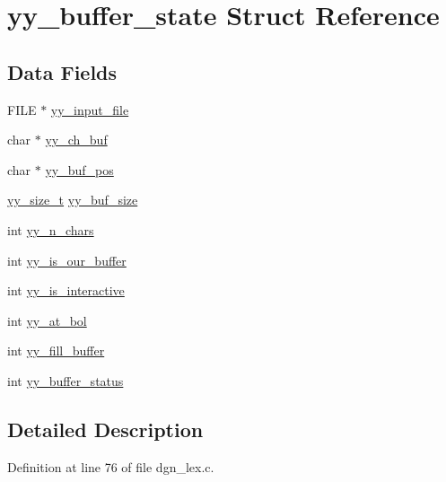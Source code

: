 \hypertarget{structyy__buffer__state}{\section{yy\+\_\+buffer\+\_\+state Struct Reference}
\label{structyy__buffer__state}
}
\subsection*{Data Fields}
\begin{DoxyCompactItemize}
\item 
F\+I\+L\+E $\ast$ \hyperlink{structyy__buffer__state_a4360acfb226a1fc240ab2be17dd6beda}{yy\+\_\+input\+\_\+file}
\item 
char $\ast$ \hyperlink{structyy__buffer__state_a0d25458e69eb22207fc633a1255d099d}{yy\+\_\+ch\+\_\+buf}
\item 
char $\ast$ \hyperlink{structyy__buffer__state_a8435c3f786bbb55d21d0174e4cfc22a0}{yy\+\_\+buf\+\_\+pos}
\item 
\hyperlink{dgn__lex_8c_aa14cc3d400000eef0cd40225fd790cfe}{yy\+\_\+size\+\_\+t} \hyperlink{structyy__buffer__state_a48302f5f3477a9c78bbddf56d356ef54}{yy\+\_\+buf\+\_\+size}
\item 
int \hyperlink{structyy__buffer__state_a06406208824817acfec2183b79080945}{yy\+\_\+n\+\_\+chars}
\item 
int \hyperlink{structyy__buffer__state_a80ce2431c70dc4f89ced487f18449465}{yy\+\_\+is\+\_\+our\+\_\+buffer}
\item 
int \hyperlink{structyy__buffer__state_abf5c70eea75581b58c0ee7bd31b14490}{yy\+\_\+is\+\_\+interactive}
\item 
int \hyperlink{structyy__buffer__state_a9d60c60af6e1a6f69de16871fd64f85f}{yy\+\_\+at\+\_\+bol}
\item 
int \hyperlink{structyy__buffer__state_a63d2afbb1d79a3fc63df9e12626f827d}{yy\+\_\+fill\+\_\+buffer}
\item 
int \hyperlink{structyy__buffer__state_a70fd925d37a2f0454fbd0def675d106c}{yy\+\_\+buffer\+\_\+status}
\end{DoxyCompactItemize}


\subsection{Detailed Description}


Definition at line 76 of file dgn\+\_\+lex.\+c.




